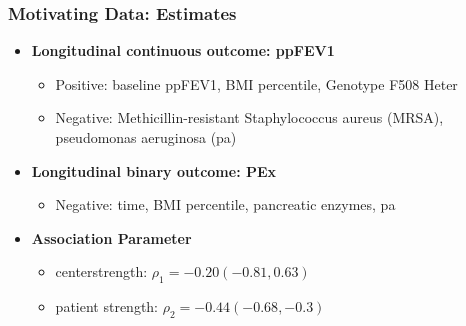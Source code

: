 \documentclass[fleqn]{beamer}
\begin{document}
\begin{frame}
\frametitle{Motivating Data: Estimates}
\setcounter{footnote}{0}
\renewcommand*{\thefootnote}{\fnsymbol{footnote}}
\begin{itemize}
    \item \textbf{Longitudinal continuous outcome: ppFEV1}
    \begin{itemize}
        \item Positive: baseline ppFEV1, BMI percentile, Genotype F508 Heter
        \item Negative: Methicillin-resistant Staphylococcus aureus (MRSA), pseudomonas aeruginosa (pa) \footnotemark[1]
    \end{itemize}
    \item \textbf{Longitudinal binary outcome: PEx}
    \begin{itemize}
        \item Negative: time, BMI percentile, pancreatic enzymes, pa
    \end{itemize}
    \item \textbf{Association Parameter}
    \begin{itemize}
        \item center\footnotemark[1] strength: $\rho_1 = -0.20 (-0.81, 0.63)$
        \item patient strength: $\rho_2 = -0.44 (-0.68, -0.3)$
    \end{itemize}
\end{itemize}

\end{frame}
\end{document}
